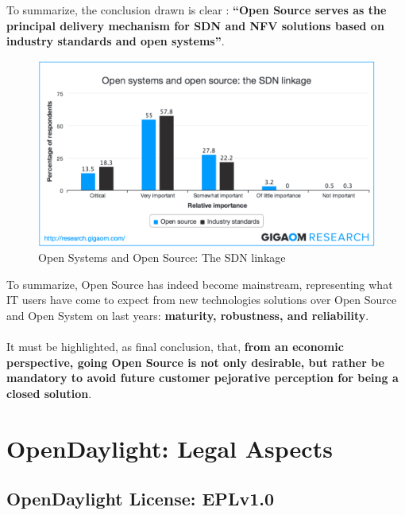 \documentclass[a4paper, 12pt]{book}
\begin{document}
To summarize, the conclusion drawn is clear : \textbf{``Open Source serves as the principal delivery mechanism for SDN and NFV solutions based on industry standards and open systems''}.
\begin{center}
 \begin{figure}[H]
 \begin{center}
   \includegraphics[width=15cm]{img/open-source-success-operator-view-00.png}
   \caption{Open Systems and Open Source: The SDN linkage}
   \label{fig:sdn_hype_cyle}
 \end{center}
 \end{figure}
\end{center}
To summarize, Open Source has indeed become mainstream, representing what IT users have come to expect from new technologies solutions over Open Source and Open System on last years: \textbf{maturity, robustness, and reliability}.\\
\\
It must be highlighted, as final conclusion, that, \textbf{from an economic perspective, going Open Source is not only desirable, but rather be mandatory to avoid future customer pejorative perception for being a closed solution}.

\chapter{OpenDaylight: Legal Aspects}
\label{chap:odllegal}

\section{OpenDaylight License: EPLv1.0}
\label{sec:odllicense}
\end{document}
